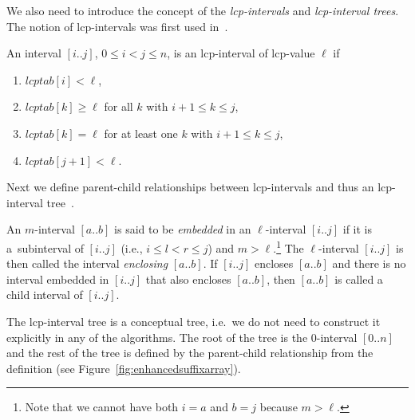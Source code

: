 We also need to introduce the concept of the \emph{lcp-intervals} and \emph{lcp-interval trees}. The notion of lcp-intervals was first used in~\cite{enhancedsuffixarrays}.
\begin{definition}
An interval $[i..j]$, $0 \leq i < j \leq n$, is an lcp-interval of lcp-value $\ell$ if

\begin{enumerate}
\item $lcptab[i] < \ell$,
\item $lcptab[k] \geq \ell$ for all $k$ with $i + 1 \leq k \leq j$,
\item $lcptab[k] = \ell$ for at least one $k$ with $i + 1 \leq k \leq j$,
\item $lcptab[j + 1] < \ell$.
\end{enumerate}
\end{definition}

Next we define parent-child relationships between lcp-intervals and thus an lcp-interval tree~\cite{enhancedsuffixarrays}.

\begin{definition}
  An $m$-interval $[a..b]$ is said to be \emph{embedded} in an $\ell$-interval $[i..j]$ if it is a~subinterval of $[i..j]$ (i.e., $i \leq l < r \leq j $) and $m > \ell$.\footnote{Note that we cannot have both $i = a$ and $b = j$ because $m > \ell$.}
  The $\ell$-interval $[i..j ]$ is then called the interval \emph{enclosing} $[a..b]$. If $[i..j]$ encloses $[a..b]$ and there is no interval embedded in $[i..j]$ that also encloses $[a..b]$, then $[a..b]$ is called a child interval of $[i..j]$.
\end{definition}

The lcp-interval tree is a conceptual tree, i.e.\ we do not need to construct it explicitly in any of the algorithms. The root of the tree is the $0$-interval $[0..n]$ and the rest of the tree is defined by the parent-child relationship from the definition (see Figure~\ref{fig:enhancedsuffixarray}).

